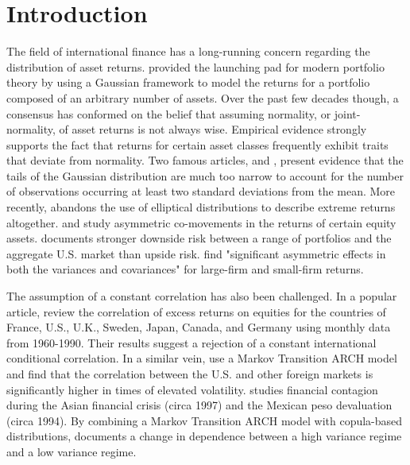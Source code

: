 \section{Introduction}

The field of international finance has a long-running concern regarding the distribution of asset returns. \cite{Markowitz_1952, Markowitz_1959} provided the launching pad for modern portfolio theory by using a Gaussian framework to model the returns for a portfolio composed of an arbitrary number of assets. Over the past few decades though, a consensus has conformed on the belief that assuming normality, or joint-normality, of asset returns is not always wise. Empirical evidence strongly supports the fact that returns for certain asset classes frequently exhibit traits that deviate from normality. Two famous articles, \cite{Mandelbrot_1963} and \cite{Fama_1965}, present evidence that the tails of the Gaussian distribution are much too narrow to account for the number of observations occurring at least two standard deviations from the mean. More recently, \cite{Longin_1996} abandons the use of elliptical distributions to describe extreme returns altogether. \cite{Ang_and_Chen_2002} and \cite{Kroner_and_Ng_1998} study asymmetric co-movements in the returns of certain equity assets. \cite{Ang_and_Chen_2002} documents stronger downside risk between a range of portfolios and the aggregate U.S. market than upside risk. \cite{Kroner_and_Ng_1998} find "significant asymmetric effects in both the variances and covariances" for large-firm and small-firm returns.

The assumption of a constant correlation has also been challenged. In a popular article, \cite{Longin_and_Solnik_1995} review the correlation of excess returns on equities for the countries of France, U.S., U.K., Sweden, Japan, Canada, and Germany using monthly data from 1960-1990. Their results suggest a rejection of a constant international conditional correlation. In a similar vein, \cite{Ramchand_and_Susmel_1998} use a Markov Transition ARCH model and find that the correlation between the U.S. and other foreign markets is significantly higher in times of elevated volatility. \cite{Rodriguez_2007} studies financial contagion during the Asian financial crisis (circa 1997) and the Mexican peso devaluation (circa 1994). By combining a Markov Transition ARCH model with copula-based distributions, \cite{Rodriguez_2007} documents a change in dependence between a high variance regime and a low variance regime.

